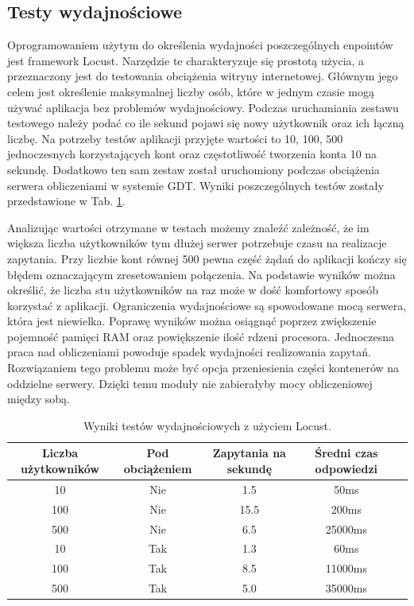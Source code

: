 \subsection{Testy wydajnościowe}
Oprogramowaniem użytym do określenia wydajności poszczególnych enpointów jest framework Locust. Narzędzie te charakteryzuje się prostotą użycia, a przeznaczony jest do testowania obciążenia witryny internetowej. Głównym jego celem jest określenie maksymalnej liczby osób, które w jednym czasie mogą używać aplikacja bez problemów wydajnościowy. Podczas uruchamiania zestawu testowego należy podać co ile sekund pojawi się nowy użytkownik oraz ich łączną liczbę. Na potrzeby testów aplikacji przyjęte wartości to 10, 100, 500 jednoczesnych korzystających kont oraz częstotliwość tworzenia konta 10 na sekundę. Dodatkowo ten sam zestaw został uruchomiony podczas obciążenia serwera obliczeniami w systemie GDT. Wyniki poszczególnych testów zostały przedstawione w Tab. \ref{tabela_4_test_locust}. 

Analizując wartości otrzymane w testach możemy znaleźć zależność, że im większa liczba użytkowników tym dłużej serwer potrzebuje czasu na realizacje zapytania. Przy liczbie kont równej 500 pewna część żądań do aplikacji kończy się błędem oznaczającym zresetowaniem połączenia. Na podstawie wyników można określić, że liczba stu użytkowników na raz może w dość komfortowy sposób korzystać z aplikacji. Ograniczenia wydajnościowe są spowodowane mocą serwera, która jest niewielka. Poprawę wyników można osiągnąć poprzez zwiększenie pojemność pamięci RAM oraz powiększenie ilość rdzeni procesora. Jednoczesna praca nad obliczeniami powoduje spadek wydajności realizowania zapytań. Rozwiązaniem tego problemu może być opcja przeniesienia części kontenerów na oddzielne serwery. Dzięki temu moduły nie zabierałyby mocy obliczeniowej między sobą.  

\begin{table}[htb]
	\caption{Wyniki testów wydajnościowych z użyciem Locust.}
	\centering
	\begin{tabular}{|c|c|c|c|p{9cm}|}
		\hline
		\textbf{Liczba użytkowników}  & \textbf{Pod obciążeniem}  & \textbf{Zapytania na sekundę} & \textbf{Średni czas odpowiedzi} \\\hline
		10 & Nie & 1.5 & 50ms \\\hline
		100 & Nie & 15.5 & 200ms \\\hline
		500 & Nie & 6.5 & 25000ms \\\hline
		10 & Tak & 1.3 & 60ms \\\hline
		100 & Tak & 8.5 & 11000ms \\\hline
		500 & Tak & 5.0 & 35000ms \\\hline
	
		
	\end{tabular}
	\label{tabela_4_test_locust}
\end{table}

